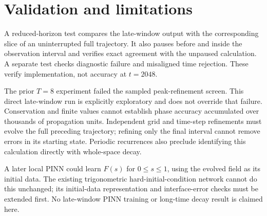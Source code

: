 \documentclass[11pt]{article}
\begin{document}
\section{Validation and limitations}
A reduced-horizon test compares the late-window output with the corresponding slice of an uninterrupted full trajectory. It also pauses before and inside the observation interval and verifies exact agreement with the unpaused calculation. A separate test checks diagnostic failure and misaligned time rejection. These verify implementation, not accuracy at $t=2048$.

The prior $T=8$ experiment failed the sampled peak-refinement screen. This direct late-window run is explicitly exploratory and does not override that failure. Conservation and finite values cannot establish phase accuracy accumulated over thousands of propagation units. Independent grid and time-step refinements must evolve the full preceding trajectory; refining only the final interval cannot remove errors in its starting state. Periodic recurrences also preclude identifying this calculation directly with whole-space decay.

A later local PINN could learn $F(s)$ for $0\leq s\leq1$, using the evolved field as its initial data. The existing trigonometric hard-initial-condition network cannot do this unchanged; its initial-data representation and interface-error checks must be extended first. No late-window PINN training or long-time decay result is claimed here.
\end{document}
